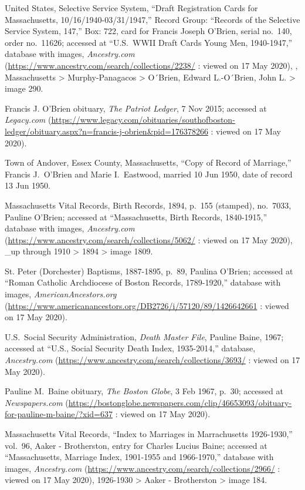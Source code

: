 \begin{thebibliography}{999}
	United States, Selective Service System, ``Draft Registration Cards for Massachusetts, 10/16/1940-03/31/1947,'' Record Group: ``Records of the Selective Service System, 147,'' Box: 722, card for Francis Joseph O'Brien, serial no.\ 140, order no.\ 11626; accessed at ``U.S.\ WWII Draft Cards Young Men, 1940-1947,'' database with images, \textit{Ancestry.com} (\url{https://www.ancestry.com/search/collections/2238/} : viewed on 17 May 2020), , Massachusetts > Murphy-Panagacos > O´Brien, Edward L.-O´Brien, John L. > image 290.
	
	Francis J. O'Brien obituary, \textit{The Patriot Ledger}, 7 Nov 2015; accessed at \textit{Legacy.com} (\url{https://www.legacy.com/obituaries/southofboston-ledger/obituary.aspx?n=francis-j-obrien\&pid=176378266} : viewed on 17 May 2020).
	
	Town of Andover, Essex County, Massachusetts, ``Copy of Record of Marriage,'' Francis J.\ O'Brien and Marie I.\ Eastwood, married 10 Jun 1950, date of record 13 Jun 1950.
	
	Massachusetts Vital Records, Birth Records, 1894, p.\ 155 (stamped), no.\ 7033, Pauline O'Brien; accessed at ``Massachusetts, Birth Records, 1840-1915,'' database with images, \textit{Ancestry.com} (\url{https://www.ancestry.com/search/collections/5062/} : viewed on 17 May 2020), \_up through 1910 > 1894 > image 1809.

	St. Peter (Dorchester) Baptisms, 1887-1895, p.\ 89, Paulina O'Brien; accessed at ``Roman Catholic Archdiocese of Boston Records, 1789-1920,'' database with images, \textit{AmericanAncestors.org} (\url{https://www.americanancestors.org/DB2726/i/57120/89/1426642661} : viewed on 17 May 2020).
	
	U.S.\ Social Security Administration, \textit{Death Master File}, Pauline Baine, 1967; accessed at ``U.S., Social Security Death Index, 1935-2014,'' database, \textit{Ancestry.com} (\url{https://www.ancestry.com/search/collections/3693/} : viewed on 17 May 2020).
	
	Pauline M.\ Baine obituary, \textit{The Boston Globe}, 3 Feb 1967, p.\ 30; accessed at \textit{Newspapers.com} (\url{https://bostonglobe.newspapers.com/clip/46653093/obituary-for-pauline-m-baine/?xid=637} : viewed on 17 May 2020).
	
	Massachusetts Vital Records, ``Index to Marriages in Marrachusetts 1926-1930,'' vol.\ 96, Aaker - Brotherston, entry for Charles Lucius Baine; accessed at ``Massachusetts, Marriage Index, 1901-1955 and 1966-1970,'' database with images, \textit{Ancestry.com} (\url{https://www.ancestry.com/search/collections/2966/} : viewed on 17 May 2020), 1926-1930 > Aaker - Brotherston > image 184.
	

\end{thebibliography}

